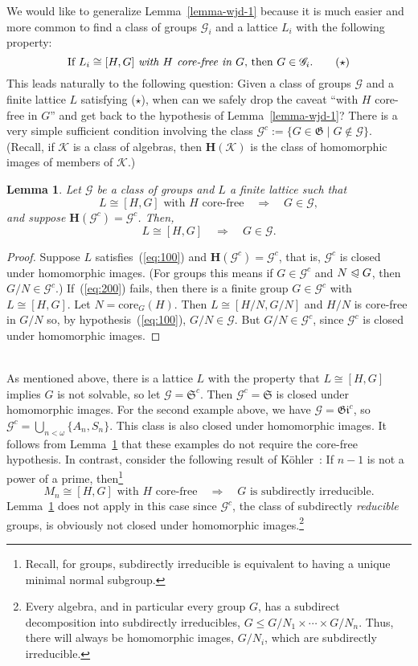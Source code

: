 \documentclass[cm,dissertation]{uhthesis}
\theoremstyle{plain}
\newtheorem{lemma}[theorem]{Lemma}
\theoremstyle{definition}
\theoremstyle{remark}
\numberwithin{theorem}{section}
\numberwithin{claim}{chapter}
\numberwithin{equation}{section}
\numberwithin{conjecture}{chapter}
\newcommand{\<}{\ensuremath{\langle}}
\renewcommand{\>}{\ensuremath{\rangle}}
\renewcommand{\leq}{\ensuremath{\leqslant}}
\newcommand{\subnormal}{\ensuremath{\trianglelefteqslant}}
\newcommand{\core}{\ensuremath{\mathrm{core}}}
\newcommand{\0}{\ensuremath{\mathbf{0}}}
\newcommand{\1}{\ensuremath{\mathbf{1}}}
\newcommand{\2}{\ensuremath{\mathbf{2}}}
\newcommand{\3}{\ensuremath{\mathbf{3}}}
\newcommand{\4}{\ensuremath{\mathbf{4}}}
\newcommand{\5}{\ensuremath{\mathbf{5}}}
\newcommand{\sG}{\ensuremath{\mathscr{G}}}
\newcommand{\G}{\ensuremath{\mathfrak{G}}}
\newcommand{\bH}{\ensuremath{\mathbf{H}}}
\newcommand{\sK}{\ensuremath{\mathscr{K}}}
\newcommand{\giant}{\ensuremath{\mathfrak{Gi}}}
\newcommand{\solvable}{\ensuremath{\mathfrak{S}}}
\begin{document}
We would like to generalize Lemma~\ref{lemma-wjd-1} because it is much easier and more
common to find a class of groups ${\sG_i}$ and a lattice $L_i$ with the following
property: 
\[
\text{If $L_i\cong [H,G]$ \emph{with $H$ core-free in $G$}, then $G\in
  {\sG_i}$}. \qquad (\star)
\]
This leads naturally to the following
question: Given a class of groups $\sG$ and a finite lattice $L$ satisfying ($\star$),   
when can we safely drop the caveat ``with $H$ core-free in $G$'' and get back to the
hypothesis of Lemma~\ref{lemma-wjd-1}?
There is a very simple sufficient condition involving
the class $\sG^c := \{ G \in \G \mid G\notin \sG\}$.  (Recall, if 
$\sK$ is a class of algebras, then $\bH(\sK)$ is the class of homomorphic images of members of $\sK$.)
\begin{lemma}
  \label{lemma-wjd-2}
Let $\sG$ be a class of groups and $L$ a finite lattice such that
\begin{equation}
  \label{eq:100}
L \cong [H,G] \text{ with $H$ core-free} \quad \Rightarrow \quad G\in \sG,
\end{equation}
and suppose $\bH(\sG^c) = \sG^c$. Then,  
\begin{equation}
  \label{eq:200}
L \cong [H,G] \quad \Rightarrow \quad G\in \sG.
\end{equation}
\end{lemma}
\begin{proof}
Suppose $L$ satisfies~(\ref{eq:100}) and $\bH(\sG^c) = \sG^c$, that is, $\sG^c$ is closed under homomorphic
images. (For groups this means if $G \in \sG^c$ and $N\subnormal G$, then
$G/N\in \sG^c$.) 
If~(\ref{eq:200}) fails, then there is a
finite group $G\in \sG^c$ with $L\cong [H,G]$.  Let $N = \core_G(H)$.  Then $L \cong
[H/N,G/N]$ and $H/N$ is core-free in $G/N$ so, by hypothesis~(\ref{eq:100}), $G/N \in \sG$.  But
$G/N \in \sG^c$, since $\sG^c$ is closed under homomorphic images.
\end{proof}
~\\[-6pt]
As mentioned above, there is a lattice $L$ with the property that
$L \cong [H, G]$ implies $G$ is not solvable,
so let $\sG = \solvable^c$.  Then $\sG^c = \solvable$ 
is closed under homomorphic images.  
For the second example above, we have $\sG = \giant^c$,
so $\sG^c = \bigcup_{n<\omega}\{A_n, S_n\}$.
This class is also closed under homomorphic images.  It follows from
Lemma~\ref{lemma-wjd-2} that these examples do not require
the core-free hypothesis.   
In contrast, consider the following result of 
%
K\"ohler~\cite{Kohler:1983}: If 
$n-1$ is not a power of a prime, then\footnote{Recall, for groups, subdirectly
  irreducible is equivalent to having a unique minimal normal subgroup.} 
\[
M_n \cong [H, G] \text{ with $H$ core-free} \quad \Rightarrow \quad G \text{ is
  subdirectly irreducible.}
\]
Lemma~\ref{lemma-wjd-2} does not apply in this case since $\sG^c$, the class of
subdirectly \emph{reducible} groups, is obviously not closed under homomorphic 
images.\footnote{Every algebra, and in particular every group $G$, has a subdirect
  decomposition into subdirectly irreducibles, $G\leq G/N_1 \times \cdots\times
  G/N_n$.  Thus, there will always be homomorphic images, $G/N_i$, which are
  subdirectly irreducible.} 
\end{document}
